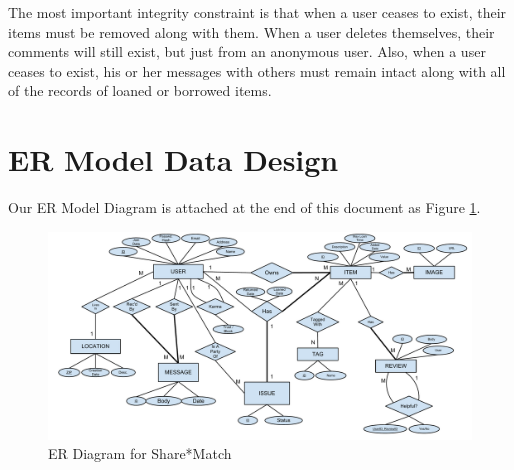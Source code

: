 \documentclass{acm_proc_article-sp}
\begin{document}
The most important integrity constraint is that when a user ceases to exist, their items must be removed along with them. When a user deletes themselves, their comments will still exist, but just from an anonymous user. Also, when a user ceases to exist, his or her messages with others must remain intact along with all of the records of loaned or borrowed items.

\section{ER Model Data Design}
Our ER Model Diagram is attached at the end of this document as Figure \ref{fig:ERDiagram}.
\begin{figure}[p]
    \includegraphics[width=\textwidth]{EECS341ProjectERDiagram.pdf}
    \caption{ER Diagram for Share*Match}
    \label{fig:ERDiagram}
\end{figure}
\end{document}
